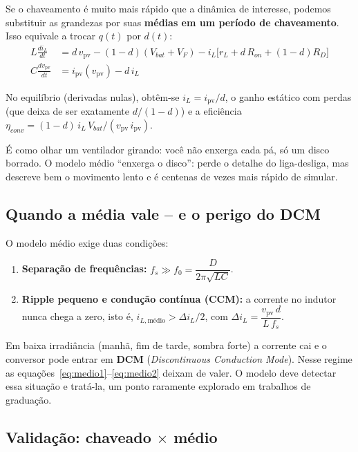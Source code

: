 \documentclass[11pt,a4paper]{article}
\newcommand{\vpv}{v_{\mathrm{pv}}}
\newcommand{\ipv}{i_{\mathrm{pv}}}
\begin{document}
Se o chaveamento é muito mais rápido que a dinâmica de interesse, podemos substituir as
grandezas por suas \textbf{médias em um período de chaveamento}. Isso equivale a trocar
$q(t)$ por $d(t)$:
\begin{align}
L\frac{di_L}{dt} &= d\,\vpv - (1-d)(V_{bat}+V_F) - i_L\big[r_L + d\,R_{on} + (1-d)R_D\big] \label{eq:medio1}\\
C\frac{d\vpv}{dt} &= \ipv(\vpv) - d\,i_L \label{eq:medio2}
\end{align}

No equilíbrio (derivadas nulas), obtêm-se $i_L=\ipv/d$, o ganho estático com perdas (que
deixa de ser exatamente $d/(1-d)$) e a eficiência
$\eta_{conv}=(1-d)\,i_L\,V_{bat}/(\vpv\,\ipv)$.

\begin{intuicao}
É como olhar um ventilador girando: você não enxerga cada pá, só um disco borrado. O modelo
médio ``enxerga o disco'': perde o detalhe do liga-desliga, mas descreve bem o movimento
lento e é centenas de vezes mais rápido de simular.
\end{intuicao}

\subsection{Quando a média vale -- e o perigo do DCM}

O modelo médio exige duas condições:
\begin{enumerate}
\item \textbf{Separação de frequências:} $f_s \gg f_0 = \dfrac{D}{2\pi\sqrt{LC}}$.
\item \textbf{Ripple pequeno e condução contínua (CCM):} a corrente no indutor nunca chega a
zero, isto é, $i_{L,\text{médio}} > \Delta i_L/2$, com $\Delta i_L = \dfrac{\vpv\,d}{L\,f_s}$.
\end{enumerate}

\begin{atencao}
Em baixa irradiância (manhã, fim de tarde, sombra forte) a corrente cai e o conversor pode
entrar em \textbf{DCM} (\emph{Discontinuous Conduction Mode}). Nesse regime as
equações~\eqref{eq:medio1}--\eqref{eq:medio2} deixam de valer. O modelo deve detectar essa
situação e tratá-la, um ponto raramente explorado em trabalhos de graduação.
\end{atencao}

\subsection{Validação: chaveado $\times$ médio}
\end{document}
